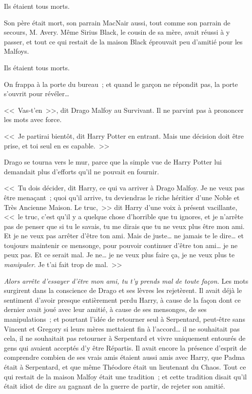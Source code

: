 Ils étaient tous morts.

Son père était mort, son parrain MacNair aussi, tout comme son parrain de secours, M. Avery. Même Sirius Black, le cousin de sa mère, avait réussi à y passer, et tout ce qui restait de la maison Black éprouvait peu d'amitié pour les Malfoys.

Ils étaient tous morts.

On frappa à la porte du bureau~; et quand le garçon ne répondit pas, la porte s'ouvrit pour révéler…

<<~Vas-t'en~>>, dit Drago Malfoy au Survivant. Il ne parvint pas à prononcer les mots avec force.

<<~Je partirai bientôt, dit Harry Potter en entrant. Mais une décision doit être prise, et toi seul en es capable.~>>

Drago se tourna vers le mur, parce que la simple vue de Harry Potter lui demandait plus d'efforts qu'il ne pouvait en fournir.

<<~Tu dois décider, dit Harry, ce qui va arriver à Drago Malfoy. Je ne veux pas être menaçant~; quoi qu'il arrive, tu deviendras le riche héritier d'une Noble et Très Ancienne Maison. Le truc,~>> dit Harry d'une voix à présent vacillante, <<~le truc, c'est qu'il y a quelque chose d'horrible que tu ignores, et je n'arrête pas de penser que si tu le savais, tu me dirais que tu ne veux plus être mon ami. Et je ne veux pas arrêter d'être ton ami. Mais de juste… ne jamais te le dire… et toujours maintenir ce mensonge, pour pouvoir continuer d'être ton ami… je ne peux pas. Et ce serait mal. Je ne… je ne veux plus faire ça, je ne veux plus te \emph{manipuler}. Je t'ai fait trop de mal.~>>

\emph{Alors arrête d'essayer d'être mon ami, tu t'y prends mal de toute façon.} Les mots surgirent dans la conscience de Drago et ses lèvres les rejetèrent. Il avait déjà le sentiment d'avoir presque entièrement perdu Harry, à cause de la façon dont ce dernier avait joué avec leur amitié, à cause de ses mensonges, de ses manipulations~; et pourtant l'idée de retourner seul à Serpentard, peut-être sans Vincent et Gregory si leurs mères mettaient fin à l'accord… il ne souhaitait pas cela, il ne souhaitait pas retourner à Serpentard et vivre uniquement entourés de gens qui avaient acceptés d'y être Répartis. Il avait encore la présence d'esprit de comprendre combien de ses vrais amis étaient aussi amis avec Harry, que Padma était à Serpentard, et que même Théodore était un lieutenant du Chaos. Tout ce qui restait de la maison Malfoy était une tradition~; et cette tradition disait qu'il était idiot de dire au gagnant de la guerre de partir, de rejeter son amitié.

